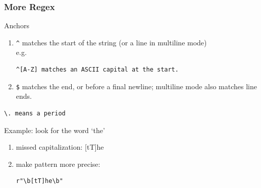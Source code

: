 \documentclass[compress, black]{beamer}
\begin{document}
\begin{frame}[fragile]
  \begin{large_enum}
  \frametitle{More Regex}
  \item[-]<1->Anchors
      \begin{enumerate}
      \item[-]<2-> \verb|^| matches the start of the string (or a line in multiline mode)\\
          e.g. \begin{verbatim}
^[A-Z] matches an ASCII capital at the start.
\end{verbatim}
      \item[-]<3-> \verb|$| matches the end, or before a final newline; multiline mode also matches line ends.
      \end{enumerate}
  \item[-]<4-> \begin{verbatim}
\. means a period
\end{verbatim}
  \item[-]<5-> Example: look for the word `the'
  \begin{enumerate}
    \item[-]<6->missed capitalization: [tT]he
    \item[-]<7->make pattern more precise: \\
          \begin{verbatim}
r"\b[tT]he\b"
\end{verbatim}
  \end{enumerate}
  \end{large_enum}
\end{frame}

\end{document}
